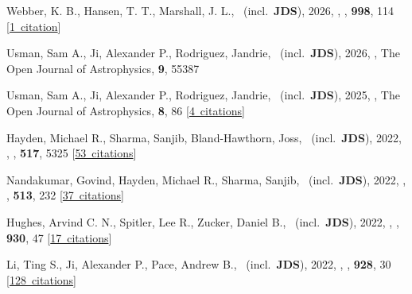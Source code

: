 \item[{\color{numcolor}\scriptsize77}] Webber, K. B., Hansen, T. T., Marshall, J. L., \etal\ (incl.\ \textbf{JDS}), 2026, , \apj, \textbf{998}, 114 [\href{https://ui.adsabs.harvard.edu/#abs/2026ApJ...998..114W}{1~citation}]

\item[{\color{numcolor}\scriptsize76}] Usman, Sam A., Ji, Alexander P., Rodriguez, Jandrie, \etal\ (incl.\ \textbf{JDS}), 2026, , The Open Journal of Astrophysics, \textbf{9}, 55387

\item[{\color{numcolor}\scriptsize75}] Usman, Sam A., Ji, Alexander P., Rodriguez, Jandrie, \etal\ (incl.\ \textbf{JDS}), 2025, , The Open Journal of Astrophysics, \textbf{8}, 86 [\href{https://ui.adsabs.harvard.edu/#abs/2025OJAp....8E..86U}{4~citations}]

\item[{\color{numcolor}\scriptsize74}] Hayden, Michael R., Sharma, Sanjib, Bland-Hawthorn, Joss, \etal\ (incl.\ \textbf{JDS}), 2022, , \mnras, \textbf{517}, 5325 [\href{https://ui.adsabs.harvard.edu/#abs/2022MNRAS.517.5325H}{53~citations}]

\item[{\color{numcolor}\scriptsize73}] Nandakumar, Govind, Hayden, Michael R., Sharma, Sanjib, \etal\ (incl.\ \textbf{JDS}), 2022, , \mnras, \textbf{513}, 232 [\href{https://ui.adsabs.harvard.edu/#abs/2022MNRAS.513..232N}{37~citations}]

\item[{\color{numcolor}\scriptsize72}] Hughes, Arvind C. N., Spitler, Lee R., Zucker, Daniel B., \etal\ (incl.\ \textbf{JDS}), 2022, , \apj, \textbf{930}, 47 [\href{https://ui.adsabs.harvard.edu/#abs/2022ApJ...930...47H}{17~citations}]

\item[{\color{numcolor}\scriptsize71}] Li, Ting S., Ji, Alexander P., Pace, Andrew B., \etal\ (incl.\ \textbf{JDS}), 2022, , \apj, \textbf{928}, 30 [\href{https://ui.adsabs.harvard.edu/#abs/2022ApJ...928...30L}{128~citations}]

